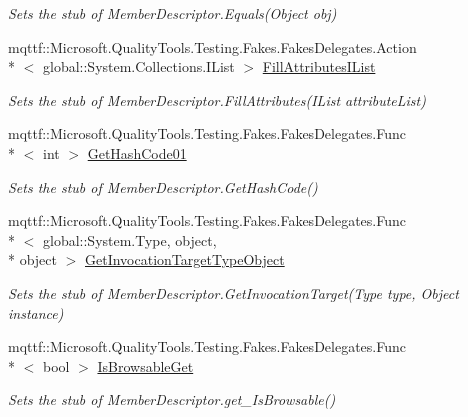 \begin{DoxyCompactItemize}
\begin{DoxyCompactList}\small\item\em Sets the stub of Member\-Descriptor.\-Equals(\-Object obj)\end{DoxyCompactList}\item 
mqttf\-::\-Microsoft.\-Quality\-Tools.\-Testing.\-Fakes.\-Fakes\-Delegates.\-Action\\*
$<$ global\-::\-System.\-Collections.\-I\-List $>$ \hyperlink{class_system_1_1_component_model_1_1_fakes_1_1_stub_member_descriptor_a0abca3503fab88aa8cd102f36971d121}{Fill\-Attributes\-I\-List}
\begin{DoxyCompactList}\small\item\em Sets the stub of Member\-Descriptor.\-Fill\-Attributes(\-I\-List attribute\-List)\end{DoxyCompactList}\item 
mqttf\-::\-Microsoft.\-Quality\-Tools.\-Testing.\-Fakes.\-Fakes\-Delegates.\-Func\\*
$<$ int $>$ \hyperlink{class_system_1_1_component_model_1_1_fakes_1_1_stub_member_descriptor_a272524132eff73e087b2dd006c51e176}{Get\-Hash\-Code01}
\begin{DoxyCompactList}\small\item\em Sets the stub of Member\-Descriptor.\-Get\-Hash\-Code()\end{DoxyCompactList}\item 
mqttf\-::\-Microsoft.\-Quality\-Tools.\-Testing.\-Fakes.\-Fakes\-Delegates.\-Func\\*
$<$ global\-::\-System.\-Type, object, \\*
object $>$ \hyperlink{class_system_1_1_component_model_1_1_fakes_1_1_stub_member_descriptor_a039c296abd2ef560d893d0dc5d1a46da}{Get\-Invocation\-Target\-Type\-Object}
\begin{DoxyCompactList}\small\item\em Sets the stub of Member\-Descriptor.\-Get\-Invocation\-Target(\-Type type, Object instance)\end{DoxyCompactList}\item 
mqttf\-::\-Microsoft.\-Quality\-Tools.\-Testing.\-Fakes.\-Fakes\-Delegates.\-Func\\*
$<$ bool $>$ \hyperlink{class_system_1_1_component_model_1_1_fakes_1_1_stub_member_descriptor_ae1418792897ffea8be5a6165e362323e}{Is\-Browsable\-Get}
\begin{DoxyCompactList}\small\item\em Sets the stub of Member\-Descriptor.\-get\-\_\-\-Is\-Browsable()\end{DoxyCompactList}\item 

\end{DoxyCompactItemize}
